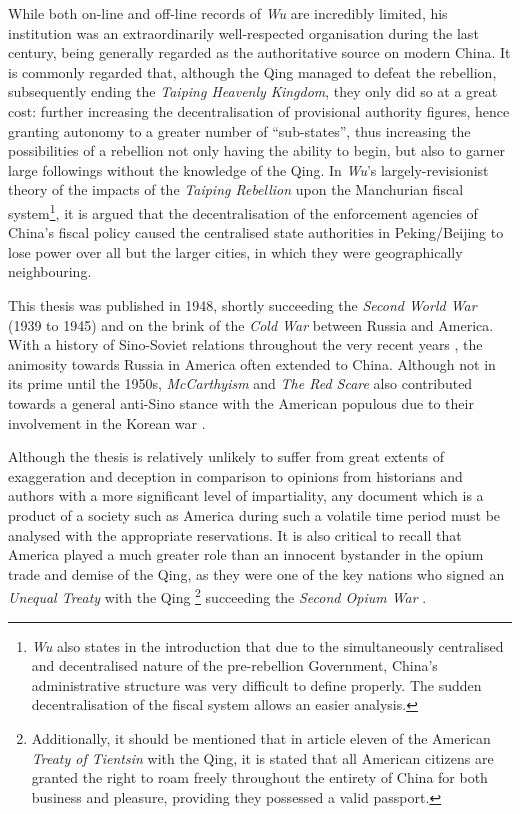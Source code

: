 \documentclass{article}
\begin{document}
        While both on-line and off-line records of \textit{Wu} are incredibly limited, his institution was an extraordinarily well-respected organisation during the last century, being generally regarded as the authoritative source on modern China. It is commonly regarded that, although the Qing managed to defeat the rebellion, subsequently ending the \textit{Taiping Heavenly Kingdom}, they only did so at a great cost: further increasing the decentralisation of provisional authority figures, hence granting autonomy to a greater number of ``sub-states'', thus increasing the possibilities of a rebellion not only having the ability to begin, but also to garner large followings without the knowledge of the Qing. In \textit{Wu}'s largely-revisionist theory of the impacts of the \textit{Taiping Rebellion} upon the Manchurian fiscal system\footnote{\textit{Wu} also states in the introduction that due to the simultaneously centralised and decentralised nature of the pre-rebellion Government, China's administrative structure was very difficult to define properly. The sudden decentralisation of the fiscal system allows an easier analysis.}, it is argued that the decentralisation of the enforcement agencies of China's fiscal policy caused the centralised state authorities in Peking/Beijing to lose power over all but the larger cities, in which they were geographically neighbouring.

        This thesis was published in 1948, shortly succeeding the \textit{Second World War} (1939 to 1945) and on the brink of the \textit{Cold War} between Russia and America. With a history of Sino-Soviet relations throughout the very recent years \autocite{Garver:1989}, the animosity towards Russia in America often extended to China. Although not in its prime until the 1950s, \textit{McCarthyism} and \textit{The Red Scare} also contributed towards a general anti-Sino stance with the American populous due to their involvement in the Korean war \autocite{Schrecker:1998}.

        Although the thesis is relatively unlikely to suffer from great extents of exaggeration and deception in comparison to opinions from historians and authors with a more significant level of impartiality, any document which is a product of a society such as America during such a volatile time period must be analysed with the appropriate reservations. It is also critical to recall that America played a much greater role than an innocent bystander in the opium trade and demise of the Qing, as they were one of the key nations who signed an \textit{Unequal Treaty} with the Qing \autocite{Peters:1961}\footnote{Additionally, it should be mentioned that in article eleven of the American \textit{Treaty of Tientsin} with the Qing, it is stated that all American citizens are granted the right to roam freely throughout the entirety of China for both business and pleasure, providing they possessed a valid passport.} succeeding the \textit{Second Opium War} \autocite{Johnstone:1937}.
\end{document}
